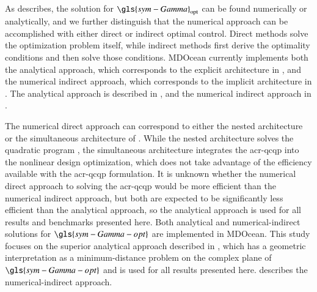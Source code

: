 \ifdefined\DISSERTATION
    As  describes, the solution for $\gls{sym-Gamma}_{\text{opt}}$ can be found numerically or analytically, and we further distinguish that the numerical approach can be accomplished with either direct or indirect optimal control.
    Direct methods solve the optimization problem itself, while indirect methods first derive the optimality conditions and then solve those conditions.
    MDOcean currently implements both the analytical approach, which corresponds to the explicit architecture in , and the numerical indirect approach, which corresponds to the implicit architecture in .
    The analytical approach is described in , and the numerical indirect approach in .

    The numerical direct approach can correspond to either the nested architecture or the simultaneous architecture of .
    While the nested architecture solves the quadratic program , the simultaneous architecture integrates the \gls{acr-qcqp} into the nonlinear design optimization, which does not take advantage of the efficiency available with the \gls{acr-qcqp} formulation.
    It is unknown whether the numerical direct approach to solving the \gls{acr-qcqp} would be more efficient than the numerical indirect approach, but both are expected to be significantly less efficient than the analytical approach, so the analytical approach is used for all results and benchmarks presented here.
\else
    Both analytical and numerical-indirect solutions for $\gls{sym-Gamma-opt}$ are implemented in MDOcean.
    This study focuses on the superior analytical approach described in , which has a geometric interpretation as a minimum-distance problem on the complex plane of $\gls{sym-Gamma-opt}$ and is used for all results presented here.
    \citet[Appendix A.3.3]{mccabe_dissertation_2026} describes the numerical-indirect approach.
\fi

